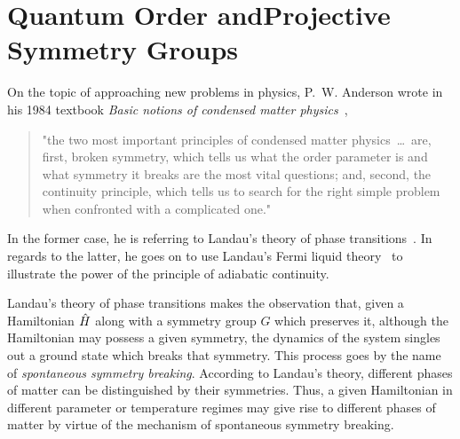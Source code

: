 \chapter[Quantum Order and Projective Symmetry Groups]{Quantum Order and\linebreak Projective Symmetry Groups}
\label{chapter:ProjectiveSymmetryGroup}
%
%
On the topic of approaching new problems in physics, P.~W. Anderson wrote in his 1984 textbook \textit{Basic notions of condensed matter physics}~\cite{Anderson1984},
%
\begin{quote}
	"the two most important principles of condensed matter physics~\ldots~are, first, broken symmetry, which tells us what the order parameter is and what symmetry it breaks are the most vital questions; and, second, the continuity principle, which tells us to search for the right simple problem when confronted with a complicated one."
\end{quote}
%
In the former case, he is referring to Landau's theory of phase transitions~\cite{LandauNature1936,LandauZETF1937,GinzburgZETF1950}.
In regards to the latter, he goes on to use Landau's Fermi liquid theory~\cite{LandauZETF1956,LandauZETF1957,LandauZETF1958} to illustrate the power of the principle of adiabatic continuity.

Landau's theory of phase transitions makes the observation that, given a Hamiltonian $\hat{H}$ along with a symmetry group $G$ which preserves it, although the Hamiltonian may possess a given symmetry, the dynamics of the system singles out a ground state which breaks that symmetry.
This process goes by the name of \textit{spontaneous symmetry breaking}.
According to Landau's theory, different phases of matter can be distinguished by their symmetries.
Thus, a given Hamiltonian in different parameter or temperature regimes may give rise to different phases of matter by virtue of the mechanism of spontaneous symmetry breaking.

